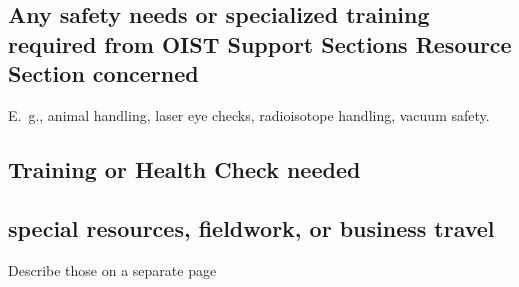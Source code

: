 \documentclass[fontsize=11pt, twocolumn]{scrartcl}	 %
\begin{document}
\subsection*{Any safety needs or specialized training required from OIST Support Sections Resource Section concerned}

E.~g., animal handling, laser eye checks, radioisotope handling, vacuum safety.

\subsection*{Training or Health Check needed}

\subsection*{special resources, fieldwork, or business travel}

Describe those on a separate page
\end{document}
